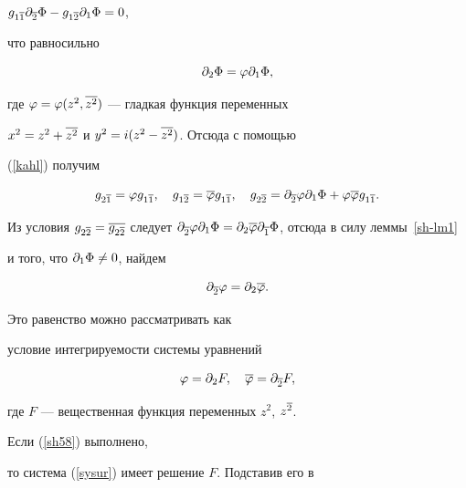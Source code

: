 $g_{1\overline 1}\partial_{\overline 2}\Phi - g_{1\overline 2}\partial_ 1 \Phi = 0$,


что равносильно


\begin{equation}


\label{sh57}


\pl 2\Phi =\varphi\pl 1\Phi,


\end{equation}


где $\varphi=\varphi(z^2,\overline{z^2})$ --- гладкая функция переменных


$x^2=z^2+\overline{z^2}$ и $y^2=i(z^2-\overline {z^2})$. Отсюда с помощью


(\ref{kahl}) получим


$$


g_{2\ol 1} = \varphi g_{1\ol 1}, \quad g_{1\ol 2}=


\ol\varphi g_{1\ol 1},\quad


g_{2\ol 2}= \pl{\ol 2}\varphi \pl 1\Phi+


\varphi\ol\varphi g_{1\ol 1}.


$$


Из условия $g_{2\ol 2}= \ol{g_{2\ol 2}}$ следует $\pl{\ol 2}\varphi\pl


1\Phi=\pl 2\ol\varphi\pl{\ol 1}\Phi$, отсюда в силу леммы~\ref{sh-lm1}


и того, что $\partial_ 1 \Phi\neq 0$, найдем


\begin{equation}


\label{sh58}


\pl{\ol 2}\varphi= \pl 2\ol\varphi.


\end{equation}


Это равенство можно рассматривать как


условие интегрируемости системы уравнений


\begin{equation}


\label{sysur}


\varphi = \pl 2 F, \quad


\ol\varphi = \pl{\ol 2} F,


\end{equation}


где $F$ --- вещественная функция переменных $z^2$, $z^{\overline 2}$.


Если (\ref{sh58}) выполнено,


то система (\ref{sysur}) имеет решение $F$. Подставив его в



